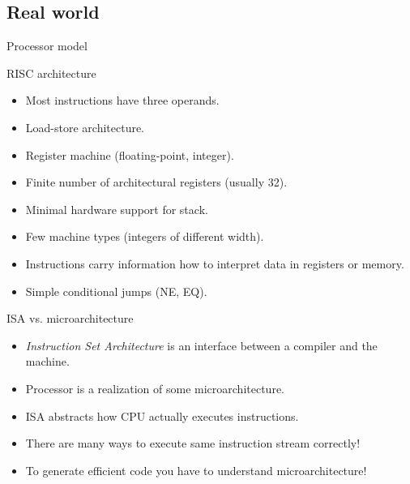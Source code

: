 \documentclass[8pt]{beamer}
\begin{document}
\subsection*{Real world}

\begin{frame}{Processor model}
  \begin{block}{RISC architecture}
    \begin{itemize}
      \item Most instructions have three operands.
      \item Load-store architecture.
      \item Register machine (floating-point, integer).
      \item Finite number of architectural registers (usually 32).
      \item Minimal hardware support for stack.
      \item Few machine types (integers of different width).
      \item Instructions carry information how to interpret data in registers or memory.
      \item Simple conditional jumps (NE, EQ).
    \end{itemize}
  \end{block}

  \begin{block}{ISA vs. microarchitecture}
    \begin{itemize}
      \item \textit{Instruction Set Architecture} is an interface between a compiler and the machine.
      \item Processor is a realization of some microarchitecture.
      \item ISA abstracts how CPU actually executes instructions.
      \item There are many ways to execute same instruction stream correctly!
      \item To generate efficient code you have to understand microarchitecture!
    \end{itemize}
  \end{block}
\end{frame}
\end{document}
